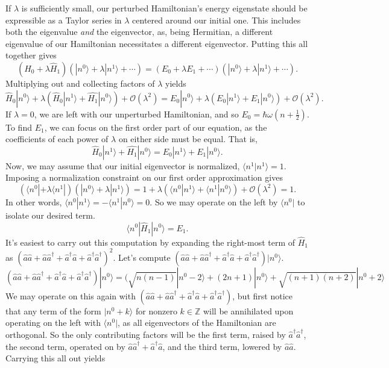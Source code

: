 \documentclass[../qft-for-the-gifted-amateur.tex]{subfiles}
\begin{document}
\begin{questions}
\begin{solution}
		If $\lambda$ is sufficiently small, our perturbed Hamiltonian's energy
		eigenstate should be expressible as a Taylor series in $\lambda$
		centered around our initial one. This includes both the eigenvalue
		\emph{and} the eigenvector, as, being Hermitian, a different eigenvalue
		of our Hamiltonian necessitates a different eigenvector. Putting this
		all together gives
		\[
		({\hat{H}}_{0} + \lambda{\hat{H}}_{1})(|n^{0}\rangle + \lambda|n^{1}\rangle + \cdots) = (E_{0} + \lambda E_{1} + \cdots)(|n^{0}\rangle + \lambda|n^{1}\rangle + \cdots).
		\]
		Multiplying out and collecting factors of $\lambda$ yields
		\[
		{\hat{H}}_{0}|n^{0}\rangle + \lambda({\hat{H}}_{0}|n^{1}\rangle + \hat{H_{1}}|n^{0}\rangle) + \mathcal{O}(\lambda^{2}) = E_{0}|n^{0}\rangle + \lambda(E_{0}|n^{1}\rangle + E_{1}|n^{0}\rangle) + \mathcal{O}(\lambda^{2}).
		\]
		If $\lambda = 0$, we are left with our unperturbed Hamiltonian, and so
		$E_{0} = \hbar\omega(n + \frac{1}{2})$. To find $E_{1}$, we can
		focus on the first order part of our equation, as the coefficients of
		each power of $\lambda$ on either side must be equal. That is,
		\[
		{\hat{H}}_{0}|n^{1}\rangle + \hat{H_{1}}|n^{0}\rangle = E_{0}|n^{1}\rangle + E_{1}|n^{0}\rangle.
		\]
		Now, we may assume that our initial eigenvector is normalized,
		$\langle n^{1}|n^{1}\rangle = 1$. Imposing a normalization constraint
		on our first order approximation gives
		\[
		(\langle n^{0}| + \lambda\langle n^{1}|)(|n^{0}\rangle + \lambda|n^{1}\rangle) = 1 + \lambda(\langle n^{0}|n^{1}\rangle + \langle n^{1}|n^{0}\rangle) + \mathcal{O}(\lambda^{2}) = 1.
		\]
		In other words,
		$\langle n^{0}|n^{1}\rangle = -\langle n^{1}|n^{0}\rangle = 0$. So we
		may operate on the left by $\langle n^{0}|$ to isolate our desired
		term.
		\[
		\langle n^{0}|{\hat{H}}_{1}|n^{0}\rangle = E_{1}.
		\]
		It's easiest to carry out this computation by expanding the right-most
		term of ${\hat{H}}_{1}$ as
		$(\hat{a}\hat{a} + \hat{a}{\hat{a}}^{\dagger} + {\hat{a}}^{\dagger}\hat{a} + {\hat{a}}^{\dagger}{\hat{a}}^{\dagger})^{2}$. Let's compute
		$(\hat{a}\hat{a} + \hat{a}{\hat{a}}^{\dagger} + {\hat{a}}^{\dagger}\hat{a} + {\hat{a}}^{\dagger}{\hat{a}}^{\dagger})|n^{0}\rangle$.
		\[
		(\hat{a}\hat{a} + \hat{a}{\hat{a}}^{\dagger} + {\hat{a}}^{\dagger}\hat{a} + {\hat{a}}^{\dagger}{\hat{a}}^{\dagger})|n^{0}\rangle = (\sqrt{n(n - 1)}|n^{0} - 2\rangle + (2n + 1)|n^{0}\rangle + \sqrt{(n + 1)(n + 2)}|n^{0} + 2\rangle
		\]
		We may operate on this again with $(\hat{a}\hat{a} + \hat{a}{\hat{a}}^{\dagger} + {\hat{a}}^{\dagger}\hat{a} + {\hat{a}}^{\dagger}{\hat{a}}^{\dagger})$, but first notice that any term of the form $|n^{0} + k\rangle$ for nonzero $k \in \mathbb{Z}$ will be annihilated upon operating on the left with $\langle n^{0}|$, as all eigenvectors of the Hamiltonian are orthogonal. So the only contributing factors will be the first term, raised by ${\hat{a}}^{\dagger}{\hat{a}}^{\dagger}$, the second term, operated on by $\hat{a}{\hat{a}}^{\dagger} + {\hat{a}}^{\dagger}\hat{a}$, and the third term, lowered by $\hat{a}\hat{a}$. Carrying this all out yields

\end{solution}
\end{questions}
\end{document}
